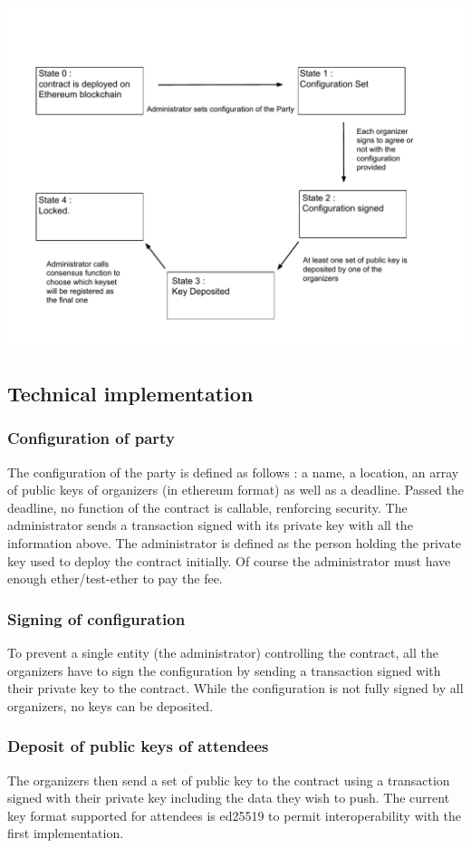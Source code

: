 \documentclass[11pt, a4paper, twoside, openright]{book} %
\begin{document}
\begin{minipage}{1\linewidth}
    \includegraphics[scale = 0.67]{fsm.pdf}
\end{minipage}%

\subsection{Technical implementation}
\subsubsection{Configuration of party}
The configuration of the party is defined as follows : a name, a location, an array of public keys of organizers (in ethereum format) as well as a deadline. Passed the deadline, no function of the contract is callable, renforcing security. The administrator sends a transaction signed with its private key with all the information above. The administrator is defined as the person holding the private key used to deploy the contract initially. Of course the administrator must have enough ether/test-ether to pay the fee. 
\subsubsection{Signing of configuration}
 To prevent a single entity (the administrator) controlling the contract, all the organizers have to sign the configuration by sending a transaction signed with their private key to the contract. While the configuration is not fully signed by all organizers, no keys can be deposited.
\subsubsection{Deposit of public keys of attendees}  
 The organizers then send a set of public key to the contract using a transaction signed with their private key including the data they wish to push. The current key format supported for attendees is ed25519 to permit interoperability with the first implementation.
\end{document}
